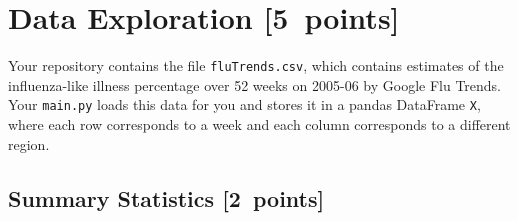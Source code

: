 \documentclass{article}
\newcommand\pts[1]{\textcolor{pointscolour}{[#1~points]}}
\begin{document}
  \section{Data Exploration \pts{5}}


  Your repository contains the file \texttt{fluTrends.csv}, which contains estimates
  of the influenza-like illness percentage over 52 weeks on 2005-06 by Google Flu Trends.
  Your \texttt{main.py} loads this data for you and stores it in a pandas DataFrame \texttt{X},
  where each row corresponds to a week and each column
  corresponds to a different
  region.

  \subsection{Summary Statistics \pts{2}}
\end{document}
